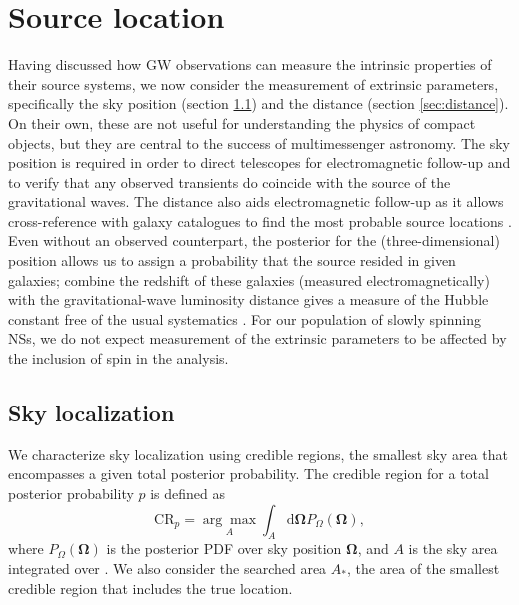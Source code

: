 \section{Source location}\label{sec:extrinsic}

Having discussed how GW observations can measure the intrinsic properties of their source systems, we now consider the measurement of extrinsic parameters, specifically the sky position (section \ref{sec:sky}) and the distance (section \ref{sec:distance}). On their own, these are not useful for understanding the physics of compact objects, but they are central to the success of multimessenger astronomy. The sky position is required in order to direct telescopes for electromagnetic follow-up and to verify that any observed transients do coincide with the source of the gravitational waves. The distance also aids electromagnetic follow-up as it allows cross-reference with galaxy catalogues to find the most probable source locations \citep{Nissanke_2012,Fan_2014}. Even without an observed counterpart, the posterior for the (three-dimensional) position allows us to assign a probability that the source resided in given galaxies; combine the redshift of these galaxies (measured electromagnetically) with the gravitational-wave luminosity distance gives a measure of the Hubble constant free of the usual systematics \citep{Schutz_1986,Del_Pozzo_2012}. For our population of slowly spinning NSs, we do not expect measurement of the extrinsic parameters to be affected by the inclusion of spin in the analysis.

\subsection{Sky localization}\label{sec:sky}

We characterize sky localization using credible regions, the smallest sky area that encompasses a given total posterior probability. The credible region for a total posterior probability $p$ is defined as
\begin{equation}
\mathrm{CR}_p = \underset{A}{\arg\!\max} \int_A \mathrm{d}\boldsymbol{\Omega} P_{\Omega}(\boldsymbol{\Omega}),
\label{eq:CR}
\end{equation}
where $P_{\Omega}(\boldsymbol{\Omega})$ is the posterior PDF over sky position $\boldsymbol{\Omega}$, and $A$ is the sky area integrated over \citep{Sidery_2014}. We also consider the searched area $A_\ast$, the area of the smallest credible region that includes the true location.

